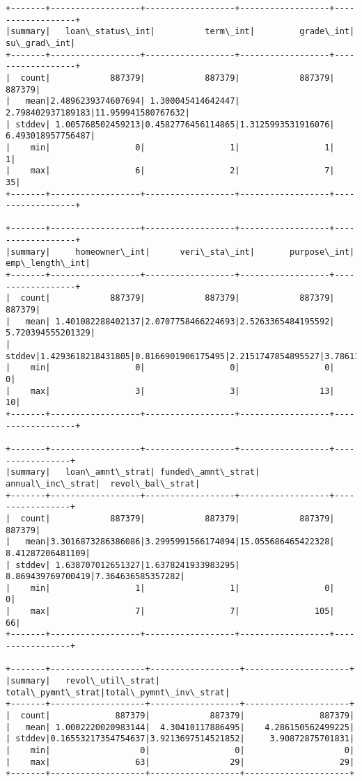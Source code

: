 \documentclass[11pt]{article}
\begin{document}
    \begin{Verbatim}[commandchars=\\\{\}]
+-------+------------------+------------------+------------------+------------------+
|summary|   loan\_status\_int|          term\_int|         grade\_int|       su\_grad\_int|
+-------+------------------+------------------+------------------+------------------+
|  count|            887379|            887379|            887379|            887379|
|   mean|2.4896239374607694| 1.300045414642447| 2.798402937189183|11.959941580767632|
| stddev| 1.005768502459213|0.4582776456114865|1.3125993531916076| 6.493018957756487|
|    min|                 0|                 1|                 1|                 1|
|    max|                 6|                 2|                 7|                35|
+-------+------------------+------------------+------------------+------------------+

+-------+------------------+------------------+------------------+------------------+
|summary|     homeowner\_int|      veri\_sta\_int|       purpose\_int|    emp\_length\_int|
+-------+------------------+------------------+------------------+------------------+
|  count|            887379|            887379|            887379|            887379|
|   mean| 1.401082288402137|2.0707758466224693|2.5263365484195592| 5.720394555201329|
| stddev|1.4293618218431805|0.8166901906175495|2.2151747854895527|3.7861190875199098|
|    min|                 0|                 0|                 0|                 0|
|    max|                 3|                 3|                13|                10|
+-------+------------------+------------------+------------------+------------------+

+-------+------------------+------------------+------------------+-----------------+
|summary|   loan\_amnt\_strat| funded\_amnt\_strat|  annual\_inc\_strat|  revol\_bal\_strat|
+-------+------------------+------------------+------------------+-----------------+
|  count|            887379|            887379|            887379|           887379|
|   mean|3.3016873286386086|3.2995991566174094|15.055686465422328| 8.41287206481109|
| stddev| 1.638707012651327|1.6378241933983295| 8.869439769700419|7.364636585357282|
|    min|                 1|                 1|                 0|                0|
|    max|                 7|                 7|               105|               66|
+-------+------------------+------------------+------------------+-----------------+

+-------+-------------------+------------------+---------------------+
|summary|   revol\_util\_strat| total\_pymnt\_strat|total\_pymnt\_inv\_strat|
+-------+-------------------+------------------+---------------------+
|  count|             887379|            887379|               887379|
|   mean| 1.0002220020983144|  4.30410117886495|    4.286150562499225|
| stddev|0.16553217354754637|3.9213697514521852|     3.90872875701831|
|    min|                  0|                 0|                    0|
|    max|                 63|                29|                   29|
+-------+-------------------+------------------+---------------------+


\end{Verbatim}
\end{document}
